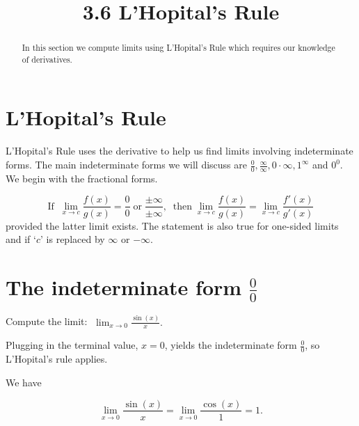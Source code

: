 \documentclass[handout]{ximera}
\title{3.6 L'Hopital's Rule}
\begin{document}
\begin{abstract}
In this section we compute limits using L'Hopital's Rule which requires our knowledge of derivatives.
\end{abstract}

\maketitle

\section{L'Hopital's Rule}

L'Hopital's Rule uses the derivative to help us find limits involving indeterminate forms. 
The main indeterminate forms we will discuss are $\frac 00, \frac{\infty}{\infty}, 0\cdot \infty, 1^\infty$ and $0^0$. We begin with the fractional forms.

\begin{theorem}

\[
\text{If} \;\; \lim_{x \to c} \frac{f(x)}{g(x)} = \frac{0}{0} \; \text{or} \; \frac{\pm \infty}{\pm \infty},
\;\;\text{then} \; \lim_{x \to c} \frac{f(x)}{g(x)} = \lim_{x \to c} \frac{f'(x)}{g'(x)}
\]
 provided the latter limit exists. The statement is also true for one-sided limits 
 and if `$c$' is replaced by $\infty$ or $-\infty$.
\end{theorem}



\section{The indeterminate form $\frac00$}


\begin{example}[example 1]
Compute the limit: $\displaystyle{\;\lim_{x \to 0} \frac{\sin(x)}{x}}.$

Plugging in the terminal value, $x=0$, yields 
the indeterminate form $\frac00$, so L'Hopital's rule applies.

We have 

\[\lim_{x \to 0} \frac{\sin(x)}{x} = \lim_{x \to 0} \frac{\cos(x)}{1} = 1.\]
\end{example}
\end{document}
